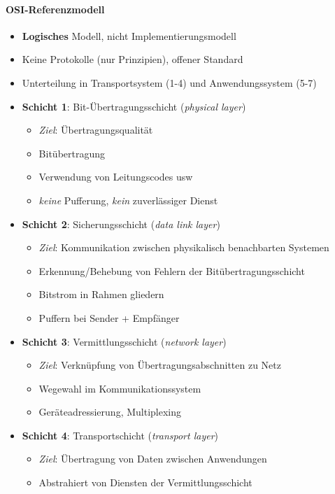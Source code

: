 \paragraph{OSI-Referenzmodell}
\begin{itemize}
\item \textbf{Logisches} Modell, nicht Implementierungsmodell
\item Keine Protokolle (nur Prinzipien), offener Standard
\item Unterteilung in Transportsystem (1-4) und Anwendungssystem (5-7)
  \item \textbf{Schicht 1}: Bit-Übertragungsschicht (\emph{physical layer})
  \begin{itemize}
    \item \emph{Ziel}: Übertragungsqualität
    \item Bitübertragung
    \item Verwendung von Leitungscodes usw
    \item \emph{keine} Pufferung, \emph{kein} zuverlässiger Dienst
  \end{itemize}
  \item \textbf{Schicht 2}: Sicherungsschicht (\emph{data link layer})
  \begin{itemize}
    \item \emph{Ziel}: Kommunikation zwischen physikalisch benachbarten Systemen
    \item Erkennung/Behebung von Fehlern der Bitübertragungsschicht
    \item Bitstrom in Rahmen gliedern
    \item Puffern bei Sender + Empfänger
  \end{itemize}
  \item \textbf{Schicht 3}: Vermittlungsschicht (\emph{network layer})
  \begin{itemize}
    \item \emph{Ziel}: Verknüpfung von Übertragungsabschnitten zu Netz
    \item Wegewahl im Kommunikationssystem
    \item Geräteadressierung, Multiplexing
  \end{itemize}
  \item \textbf{Schicht 4}: Transportschicht (\emph{transport layer})
  \begin{itemize}
    \item \emph{Ziel}: Übertragung von Daten zwischen Anwendungen
    \item Abstrahiert von Diensten der Vermittlungsschicht

\end{itemize}
\end{itemize}
